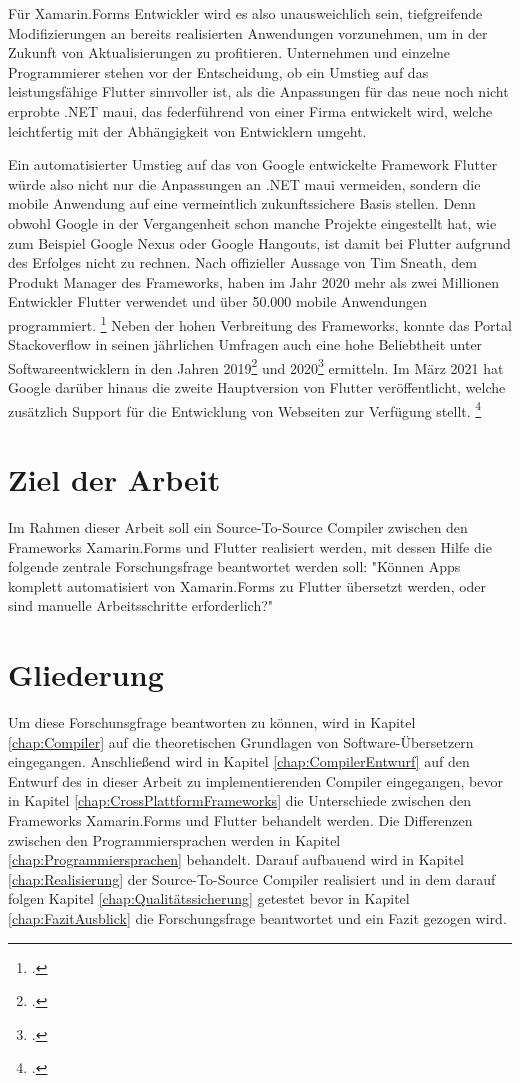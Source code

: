 Für Xamarin.Forms Entwickler wird es also unausweichlich sein,  tiefgreifende Modifizierungen an bereits realisierten Anwendungen vorzunehmen,  um in der Zukunft von Aktualisierungen zu profitieren.  Unternehmen und einzelne Programmierer stehen vor der Entscheidung,  ob ein Umstieg auf das leistungsfähige Flutter sinnvoller ist,  als die Anpassungen für das neue noch nicht erprobte .NET \ac{maui},  das federführend von einer Firma entwickelt wird,  welche leichtfertig mit der Abhängigkeit von Entwicklern umgeht.

Ein automatisierter Umstieg auf das von Google entwickelte Framework Flutter würde also nicht nur die Anpassungen an .NET \ac{maui} vermeiden,  sondern die mobile Anwendung auf eine vermeintlich zukunftssichere Basis stellen.  Denn obwohl Google in der Vergangenheit schon manche Projekte eingestellt hat,  wie zum Beispiel Google Nexus oder Google Hangouts,  ist damit bei Flutter aufgrund des Erfolges nicht zu rechnen.  Nach offizieller Aussage von Tim Sneath, dem Produkt Manager des Frameworks,  haben im Jahr 2020 mehr als zwei Millionen Entwickler Flutter verwendet und über 50.000 mobile Anwendungen programmiert. \footcite[Vgl.][Abgerufen am 28.10.2020]{Sneath2020} Neben der hohen Verbreitung des Frameworks,  konnte das Portal Stackoverflow in seinen jährlichen Umfragen auch eine hohe Beliebtheit unter Softwareentwicklern in den Jahren 2019\footcite[Vgl.][Abgerufen am 28.10.2020]{Stack2019} und 2020\footcite[Vgl.][Abgerufen am 28.10.2020]{Stack2020} ermitteln.  Im März 2021 hat Google darüber hinaus die zweite Hauptversion von Flutter veröffentlicht,  welche zusätzlich Support für die Entwicklung von Webseiten zur Verfügung stellt. \footcite[Vgl.][Abgerufen am 28.10.2020]{GoogleFlutter2}


\section{Ziel der Arbeit}
Im Rahmen dieser Arbeit soll ein Source-To-Source Compiler zwischen den Frameworks Xamarin.Forms und Flutter realisiert werden, mit dessen Hilfe die folgende zentrale Forschungsfrage beantwortet werden soll: "Können Apps komplett automatisiert von Xamarin.Forms zu Flutter übersetzt werden, oder sind manuelle Arbeitsschritte erforderlich?"

\section{Gliederung}
Um diese Forschunsgfrage beantworten zu können, wird in Kapitel \ref{chap:Compiler} auf die theoretischen Grundlagen von Software-Übersetzern eingegangen.  Anschließend wird in Kapitel \ref{chap:CompilerEntwurf} auf den Entwurf des in dieser Arbeit zu implementierenden Compiler eingegangen, bevor in Kapitel \ref{chap:CrossPlattformFrameworks} die Unterschiede zwischen den Frameworks Xamarin.Forms und Flutter behandelt werden.  Die Differenzen zwischen den Programmiersprachen werden in Kapitel \ref{chap:Programmiersprachen} behandelt. Darauf aufbauend wird in Kapitel \ref{chap:Realisierung} der Source-To-Source Compiler realisiert und in dem darauf folgen Kapitel \ref{chap:Qualitätssicherung} getestet bevor in Kapitel \ref{chap:FazitAusblick} die Forschungsfrage beantwortet und ein Fazit gezogen wird. 